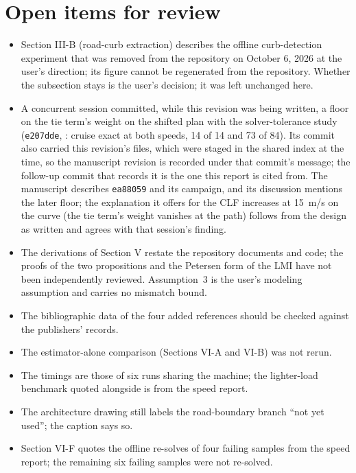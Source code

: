 \documentclass[11pt]{article}
\begin{document}
\section{Open items for review}
\begin{itemize}
\item Section III-B (road-curb extraction) describes the offline
  curb-detection experiment that was removed from the repository on
  October 6, 2026 at the user's direction; its figure cannot be regenerated
  from the repository. Whether the subsection stays is the user's decision;
  it was left unchanged here.
\item A concurrent session committed, while this revision was being
  written, a floor on the tie term's weight on the shifted plan with the
  solver-tolerance study (\texttt{e207dde},
  : cruise exact at both speeds, 14 of 14
  and 73 of 84). Its commit also carried this revision's files, which were
  staged in the shared index at the time, so the manuscript revision is
  recorded under that commit's message; the follow-up commit that records
  it is the one this report is cited from. The manuscript describes
  \texttt{ea88059} and its campaign, and its discussion mentions the
  later floor; the explanation it offers for the CLF increases at 15~m/s
  on the curve (the tie term's weight vanishes at the path) follows from
  the design as written and agrees with that session's finding.
\item The derivations of Section V restate the repository documents and
  code; the proofs of the two propositions and the Petersen form of the LMI
  have not been independently reviewed. Assumption~3 is the user's modeling
  assumption and carries no mismatch bound.
\item The bibliographic data of the four added references should be checked
  against the publishers' records.
\item The estimator-alone comparison (Sections VI-A and VI-B) was not rerun.
\item The timings are those of six runs sharing the machine; the
  lighter-load benchmark quoted alongside is from the speed report.
\item The architecture drawing still labels the road-boundary branch ``not
  yet used''; the caption says so.
\item Section VI-F quotes the offline re-solves of four failing samples from
  the speed report; the remaining six failing samples were not re-solved.
\end{itemize}
\end{document}

